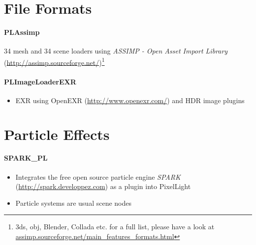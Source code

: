 \section{File Formats}


\paragraph{PLAssimp}
34 mesh and 34 scene loaders using \emph{ASSIMP - Open Asset Import Library} (\url{http://assimp.sourceforge.net/})\footnote{3ds, obj, Blender, Collada etc. for a full list, please have a look at \url{assimp.sourceforge.net/main_features_formats.html}}


\paragraph{PLImageLoaderEXR}
\begin{itemize}
\item{EXR using OpenEXR (\url{http://www.openexr.com/}) and HDR image plugins}
\end{itemize}




\section{Particle Effects}


\paragraph{SPARK\_PL}
\begin{itemize}
\item{Integrates the free open source particle engine \emph{SPARK} (\url{http://spark.developpez.com}) as a plugin into PixelLight}
\item{Particle systems are usual scene nodes}
\end{itemize}


